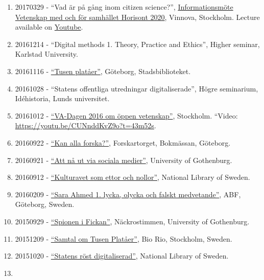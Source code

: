 \documentclass[
]{article}
\begin{document}
\begin{enumerate}
{  Göteborgs Universitet}.
\item
  20170329 - ``Vad är på gång inom citizen science?'',
  \href{http://www.vinnova.se/sv/Aktuellt--publicerat/Kalendarium/2017/170329-Informationsmote-Vetenskap-med-och-for-samhallet/}{Informationsmöte
  Vetenskap med och för samhället Horisont 2020}, Vinnova, Stockholm.
  Lecture available on \href{https://youtu.be/HHW0j7Zo5E0}{Youtube}.
\item
  20161214 - ``Digital methods 1. Theory, Practice and Ethics'', Higher
  seminar, Karlstad University.
\item
  20161116 -
  \href{http://www.stadsbiblioteket.nu/tusen-plataer/}{``Tusen
  platåer''}, Göteborg, Stadsbiblioteket.
\item
  20161028 - ``Statens offentliga utredningar digitaliserade'', Högre
  seminarium, Idéhistoria, Lunds universitet.
\item
  20161012 - \href{https://v-a.se/events/va-dagen-2016/}{``VA-Dagen 2016
  om öppen vetenskap''}, Stockholm. ``Video:
  \url{https://youtu.be/CUNnddKvZ9o?t=43m52s}.
\item
  20160922 -
  \href{http://flov.gu.se/aktuellt/Nyheter/fulltext//sju-filosofer-forelaser-pa-bokmassan-.cid1403852}{``Kan
  alla forska?''}, Forskartorget, Bokmässan, Göteborg.
\item
  20160921 -
  \href{http://kompetensutveckling.adm.gu.se/seminar/detail/2260}{``Att
  nå ut via sociala medier''}, University of Gothenburg.
\item
  20160912 -
  \href{http://www.kb.se/aktuellt/utbildningar/2016/Kulturarvet-som-ettor-och-nollor--Del-3-Digital-humaniora/}{``Kulturavet
  som ettor och nollor''}, National Library of Sweden.
\item
  20160209 -
  \href{http://www.abfgoteborg.org/index.php/archive/2016/170-filosofiscenen-2016/2208-sarah-ahmed-lycka-och-falskt-medvetande}{``Sara
  Ahmed 1. lycka, olycka och falskt medvetande''}, ABF, Göteborg,
  Sweden.
\item
  20150929 -
  \href{http://hum.gu.se/aktuellt/Nyheter/fulltext//nackrostimmen--spionen-i-fickan-som-overvakar-oss.cid1324880}{``Spionen
  i Fickan''}, Näckrostimmen, University of Gothenburg.
\item
  20151209 - \href{http://fhp.nu/tusenplataer}{``Samtal om Tusen
  Platåer''}, Bio Rio, Stockholm, Sweden.
\item
  20151020 -
  \href{http://www.kb.se/aktuellt/evenemang/2015/SOUhack/}{``Statens
  röst digitaliserad''}, National Library of Sweden.
\item

\end{enumerate}
\end{document}
